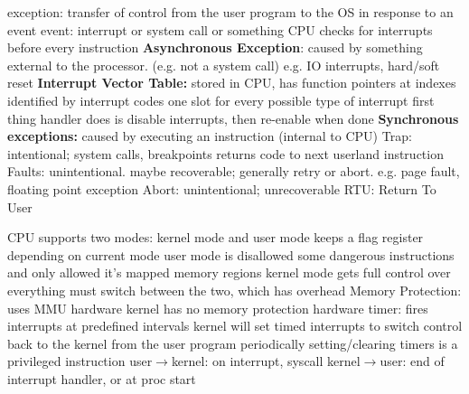 \documentclass[12pt]{article}
\begin{document}
\begin{spacing}{0.6}
\begin{multicols*}{2}
\begin{flushleft}
\begin{outline}[longenum]
  \1 exception: transfer of control from the user program to the OS in response to an event
  \1 event: interrupt or system call or something
  \1 CPU checks for interrupts before every instruction
  \1 \textbf{Asynchronous Exception}: caused by something external to the processor. (e.g. not a system call)
    \2 e.g. IO interrupts, hard/soft reset
  \1 \textbf{Interrupt Vector Table:} stored in CPU, has function pointers at indexes identified by interrupt codes
    \2 one slot for every possible type of interrupt
    \2 first thing handler does is disable interrupts, then re-enable when done
  \1 \textbf{Synchronous exceptions:} caused by executing an instruction (internal to CPU)
    \2 Trap: intentional; system calls, breakpoints
      \3 returns code to next userland instruction
    \2 Faults: unintentional. maybe recoverable; generally retry or abort.
      e.g. page fault, floating point exception
    \2 Abort: unintentional; unrecoverable
  \1 RTU: Return To User


  \1 CPU supports two modes: kernel mode and user mode
    \2 keeps a flag register depending on current mode
  \1 user mode is disallowed some dangerous instructions and only allowed it's mapped memory regions
  \1 kernel mode gets full control over everything
  \1 must switch between the two, which has overhead
  \1 Memory Protection: uses MMU hardware
    \2 kernel has no memory protection
  \1 hardware timer: fires interrupts at predefined intervals
    \2 kernel will set timed interrupts to switch control back to the kernel from the user program periodically
    \2 setting/clearing timers is a privileged instruction
  \1 user$\rightarrow$kernel: on interrupt, syscall
  \1 kernel$\rightarrow$user: end of interrupt handler, or at proc start


\end{outline}
\end{flushleft}
\end{multicols*}
\end{spacing}
\end{document}
